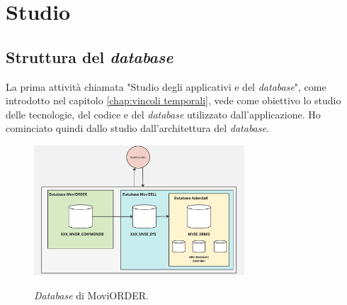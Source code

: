 \section{Studio}
\subsection{Struttura del \textit{database}}
La prima attività chiamata "Studio degli applicativi e del \textit{database}", come introdotto nel capitolo \ref{chap:vincoli temporali}, 
vede come obiettivo lo studio delle tecnologie, del codice e del \textit{database} utilizzato dall'applicazione. Ho cominciato quindi 
dallo studio dall'architettura del \textit{database}.\\

\begin{figure}[H]
    \centering
    \includegraphics[alt={Database di MoviORDER}, width=0.7\textwidth]{img/database.png}
    \caption {\textit{Database} di MoviORDER.}
    \label{fig:database}
\end{figure}

